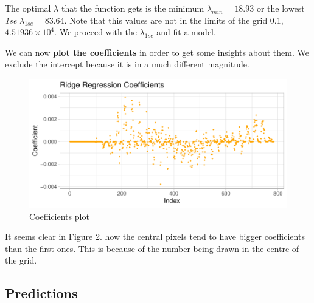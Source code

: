 \documentclass[
  10pt,
]{article}
\newenvironment{Shaded}{\begin{snugshade}}{\end{snugshade}}
\newcommand{\AttributeTok}[1]{\textcolor[rgb]{0.13,0.29,0.53}{#1}}
\newcommand{\ConstantTok}[1]{\textcolor[rgb]{0.56,0.35,0.01}{#1}}
\newcommand{\DecValTok}[1]{\textcolor[rgb]{0.00,0.00,0.81}{#1}}
\newcommand{\FloatTok}[1]{\textcolor[rgb]{0.00,0.00,0.81}{#1}}
\newcommand{\FunctionTok}[1]{\textcolor[rgb]{0.13,0.29,0.53}{\textbf{#1}}}
\newcommand{\NormalTok}[1]{#1}
\newcommand{\OtherTok}[1]{\textcolor[rgb]{0.56,0.35,0.01}{#1}}
\newcommand{\SpecialCharTok}[1]{\textcolor[rgb]{0.81,0.36,0.00}{\textbf{#1}}}
\newcommand{\StringTok}[1]{\textcolor[rgb]{0.31,0.60,0.02}{#1}}
\begin{document}
The optimal \(\lambda\) that the function gets is the minimum
\(\lambda_{min}=18.93\) or the lowest \emph{1se}
\(\lambda_{1se}=83.64\). Note that this values are not in the limits of
the grid 0.1, \ensuremath{4.51936\times 10^{4}}. We proceed with the
\(\lambda_{1se}\) and fit a model.

\begin{Shaded}
\end{Shaded}

We can now \textbf{plot the coefficients} in order to get some insights
about them. We exclude the intercept because it is in a much different
magnitude.

\begin{figure}

{\centering \includegraphics{Task1_files/figure-latex/plot-1} 

}

\caption{Coefficients plot}\label{fig:plot}
\end{figure}

It seems clear in Figure 2. how the central pixels tend to have bigger
coefficients than the first ones. This is because of the number being
drawn in the centre of the grid.

\hypertarget{predictions}{%
\subsection{Predictions}\label{predictions}}
\end{document}
